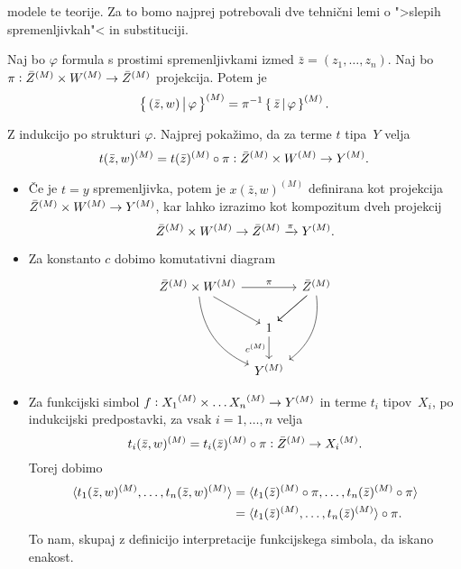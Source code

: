 \documentclass[../kategoricna_logika.tex]{subfiles}
\begin{document}
modele te teorije.  Za to bomo najprej potrebovali dve tehnični lemi o
">slepih spremenljivkah"< in substituciji.
\begin{lema}\label{lema:slepe-spremenljivke}
  Naj bo $\varphi$ formula s prostimi spremenljivkami izmed
  $\bar{z} = (z_1, \ldots, z_n)$.  Naj bo
  $\pi : \bar{Z}^{(M)} \times W^{(M)} \to {\bar{Z}}^{(M)}$
  projekcija. Potem je
  $$\left\lbrace\,(\bar{z}, w) \,\middle|\, \varphi\,\right\rbrace^{(M)} = \pi^{-1} \left\lbrace\,\bar{z} \,\middle|\, \varphi\,\right\rbrace^{(M)}.$$
\end{lema}
\begin{dokaz}
  Z indukcijo po strukturi $\varphi$.  Najprej pokažimo, da za terme
  $t$ tipa~$Y$ velja
  $$t(\bar{z}, w)^{(M)} = t(\bar{z})^{(M)} \circ \pi : {\bar{Z}}^{(M)} \times W^{(M)} \to {Y}^{(M)}.$$
  \begin{itemize}
  \item Če je $t = y$ spremenljivka, potem je $x(\bar{z},w)^{(M)}$
    definirana kot projekcija
    ${\bar{Z}}^{(M)} \times {W}^{(M)} \to Y^{(M)}$, kar lahko
    izrazimo kot kompozitum dveh projekcij
      $${\bar{Z}}^{(M)} \times {W}^{(M)} \to \bar{Z}^{(M)} \xrightarrow{\pi} Y^{(M)}.$$

    \item Za konstanto $c$ dobimo komutativni diagram
      \begin{equation*}
        \begin{tikzcd}[column sep=tiny]
          \bar{Z}^{(M)} \times \interp{W} \ar[ddr, bend right] \ar[dr]
          \ar[rr, "\pi"] & &
          \bar{Z}^{(M)} \ar[dl] \ar[dl] \ar[ddl, bend left] \\
          & 1 \ar[d, "c^{(M)}"'] & \\
          & Y^{(M)} &
        \end{tikzcd}
      \end{equation*}
    
    \item Za funkcijski simbol
      $f : {X_1}^{(M)} \times \ldots {X_n}^{(M)} \to {Y}^{(M)}$ in
      terme $t_i$ tipov~$X_i$, po indukcijski predpostavki, za vsak
      $i = 1, \ldots, n$ velja
      \[t_i(\bar{z},w)^{(M)} = t_i(\bar{z})^{(M)} \circ \pi :
        {\bar{Z}}^{(M)} \to {X_i}^{(M)}.\] Torej dobimo
      \begin{align*}
        \langle t_1(\bar{z}, w)^{(M)}, \ldots, t_n(\bar{z}, w)^{(M)} \rangle &= \langle t_1(\bar{z})^{(M)} \circ \pi, \ldots, t_n(\bar{z})^{(M)} \circ \pi \rangle \\
                                                                     &= \langle t_1(\bar{z})^{(M)}, \ldots, t_n(\bar{z})^{(M)} \rangle \circ \pi.
      \end{align*}
      To nam, skupaj z definicijo interpretacije funkcijskega simbola,
      da iskano enakost.


\end{itemize}
\end{dokaz}
\end{document}
